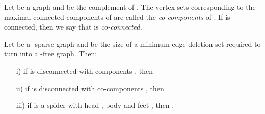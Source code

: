 \documentclass{llncs}
\begin{document}
\begin{definition}
Let  be a graph and  be the complement of . The vertex sets corresponding to the maximal connected components of  are called the \emph{co-components} of . If  is connected, then we say that  is \emph{co-connected.}
\end{definition}

\begin{proposition}\label{prop:decomposition}
 Let  be a -sparse graph and  be the size of a minimum edge-deletion set required to turn  into a -free graph. Then:
 \begin{itemize}
 \item[i)] if  is disconnected with components , then 
 \item[ii)] if  is disconnected with co-components , then 
 \item[iii)] if  is a spider with head , body  and feet , then .
 \end{itemize}
\end{proposition}
\end{document}
